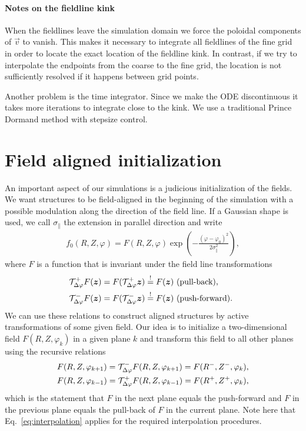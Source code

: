 \paragraph{Notes on the fieldline kink}
When the fieldlines leave the simulation domain we force the poloidal
components of $\vec v$ to vanish. This makes it necessary to integrate all
fieldlines of the fine grid in order to locate the exact location of
the fieldline kink. In contrast, if we try to interpolate the endpoints
from the coarse to the fine grid, the location is not sufficiently
resolved if it happens between grid points.

Another problem is the time integrator. Since we make the ODE
discontinuous it takes more iterations to integrate close to the kink.
We use a traditional Prince Dormand method with stepsize control.
\section{Field aligned initialization} \label{sec:parallelc}

An important aspect of our simulations is a judicious initialization of the
fields. We want structures to be field-aligned in the beginning of the simulation with
a possible modulation along the direction of the field line.
If a Gaussian shape is used, we call $\sigma_\parallel$ the extension in parallel
direction and write
\begin{align}
    f_0(R,Z,\varphi) = F(R,Z,\varphi) \exp\left( - \frac{(\varphi-\varphi_0)^2}{2\sigma_\parallel^2}\right),
    \label{eq:parallelInit}
\end{align}
where $F$ is a function that is invariant under the field line transformations
\begin{subequations}
\begin{align}
    \mathcal T^+_{\Delta\varphi} F({\boldsymbol{z}}) &= F( \mathcal T^+_{\Delta\varphi} {\boldsymbol{z}}) \overset{!}{=} F({\boldsymbol{z}}) \text{ (pull-back), } \\
    \mathcal T^-_{\Delta\varphi} F({\boldsymbol{z}}) &= F( \mathcal T^-_{\Delta\varphi} {\boldsymbol{z}}) \overset{!}{=} F({\boldsymbol{z}}) \text{ (push-forward). } 
\end{align}
\label{}
\end{subequations}
We can use these relations to construct aligned structures
by active transformations of some given field.
Our idea is to initialize a two-dimensional field $F(R,Z, \varphi_k)$ in a given plane $k$ and
transform this field to all other planes using the recursive relations
\begin{subequations}
\begin{align}
    F( R, Z, \varphi_{k+1}) = \mathcal T^-_{\Delta\varphi} F( R, Z, \varphi_{k+1}) = F(R^-, Z^-, \varphi_k), \\
    F( R, Z, \varphi_{k-1}) = \mathcal T^+_{\Delta\varphi} F( R, Z, \varphi_{k-1}) = F(R^+, Z^+, \varphi_k),
\end{align}
    \label{eq:recursiveInit}
\end{subequations}
which is the statement that $F$ in the next plane equals the push-forward
and $F$ in the previous plane equals the pull-back of $F$ in the current plane.
Note here that Eq.~\eqref{eq:interpolation} applies for the required interpolation
procedures.



